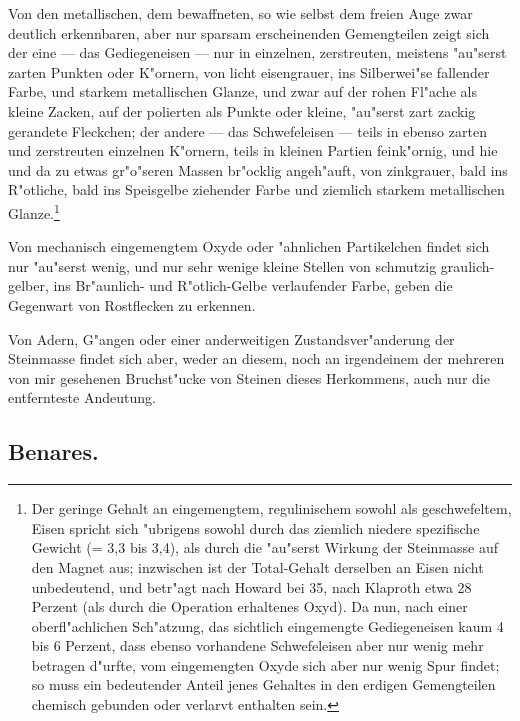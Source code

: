 \documentclass[a4paper, 11pt, oneside, german]{article}
\begin{document}
Von den metallischen, dem bewaffneten, so wie selbst dem freien Auge zwar deutlich erkennbaren, aber nur sparsam erscheinenden Gemengteilen zeigt sich der eine --- das Gediegeneisen --- nur in einzelnen, zerstreuten, meistens "au"serst zarten Punkten oder K"ornern, von licht eisengrauer, ins Silberwei"se fallender Farbe, und starkem metallischen Glanze, und zwar auf der rohen Fl"ache als kleine Zacken, auf der polierten als Punkte oder kleine, "au"serst zart zackig gerandete Fleckchen; der andere --- das Schwefeleisen --- teils in ebenso zarten und zerstreuten einzelnen K"ornern, teils in kleinen Partien feink"ornig, und hie und da zu etwas gr"o"seren Massen br"ocklig angeh"auft, von zinkgrauer, bald ins R"otliche, bald ins Speisgelbe ziehender Farbe und ziemlich starkem metallischen Glanze.\footnote{Der geringe Gehalt an eingemengtem, regulinischem sowohl als geschwefeltem, Eisen spricht sich "ubrigens sowohl durch das ziemlich niedere spezifische Gewicht (= 3,3 bis 3,4), als durch die "au"serst Wirkung der Steinmasse auf den Magnet aus; inzwischen ist der Total-Gehalt derselben an Eisen nicht unbedeutend, und betr"agt nach Howard bei 35, nach Klaproth etwa 28 Perzent (als durch die Operation erhaltenes Oxyd). Da nun, nach einer oberfl"achlichen Sch"atzung, das sichtlich eingemengte Gediegeneisen kaum 4 bis 6 Perzent, dass ebenso vorhandene Schwefeleisen aber nur wenig mehr betragen d"urfte, vom eingemengten Oxyde sich aber nur wenig Spur findet; so muss ein bedeutender Anteil jenes Gehaltes in den erdigen Gemengteilen chemisch gebunden oder verlarvt enthalten sein.}

Von mechanisch eingemengtem Oxyde oder "ahnlichen Partikelchen findet sich nur "au"serst wenig, und nur sehr wenige kleine Stellen von schmutzig graulich-gelber, ins Br"aunlich- und R"otlich-Gelbe verlaufender Farbe, geben die Gegenwart von Rostflecken zu erkennen.

Von Adern, G"angen oder einer anderweitigen Zustandsver"anderung der Steinmasse findet sich aber, weder an diesem, noch an irgendeinem der mehreren von mir gesehenen Bruchst"ucke von Steinen dieses Herkommens, auch nur die entfernteste Andeutung.

\subsection{Benares.}
\end{document}

